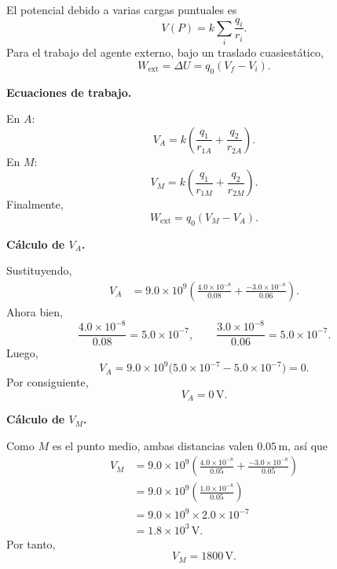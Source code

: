 \documentclass[11pt]{article}
\begin{document}
El potencial debido a varias cargas puntuales es
\begin{equation*}
    V(P)=k\sum_i \frac{q_i}{r_i}.
\end{equation*}
Para el trabajo del agente externo, bajo un traslado cuasiest\'atico,
\begin{equation*}
    W_{\text{ext}}=\Delta U=q_0(V_f-V_i).
\end{equation*}

\textbf{Ecuaciones de trabajo.}

En $A$:
\begin{equation*}
    V_A=k\left(\frac{q_1}{r_{1A}}+\frac{q_2}{r_{2A}}\right).
\end{equation*}
En $M$:
\begin{equation*}
    V_M=k\left(\frac{q_1}{r_{1M}}+\frac{q_2}{r_{2M}}\right).
\end{equation*}
Finalmente,
\begin{equation*}
    W_{\text{ext}}=q_0(V_M-V_A).
\end{equation*}

\textbf{C\'alculo de $V_A$.}

Sustituyendo,
\begin{align*}
    V_A
    &=9.0\times 10^9\left(\frac{4.0\times 10^{-8}}{0.08}+\frac{-3.0\times 10^{-8}}{0.06}\right).
\end{align*}
Ahora bien,
\begin{equation*}
    \frac{4.0\times 10^{-8}}{0.08}=5.0\times 10^{-7},
    \qquad
    \frac{3.0\times 10^{-8}}{0.06}=5.0\times 10^{-7}.
\end{equation*}
Luego,
\begin{equation*}
    V_A=9.0\times 10^9\big(5.0\times 10^{-7}-5.0\times 10^{-7}\big)=0.
\end{equation*}
Por consiguiente,
\begin{equation*}
    \boxed{V_A=0\,\text{V}}.
\end{equation*}

\textbf{C\'alculo de $V_M$.}

Como $M$ es el punto medio, ambas distancias valen $0.05\,\text{m}$, as\'i que
\begin{align*}
    V_M
    &=9.0\times 10^9\left(\frac{4.0\times 10^{-8}}{0.05}+\frac{-3.0\times 10^{-8}}{0.05}\right)\\
    &=9.0\times 10^9\left(\frac{1.0\times 10^{-8}}{0.05}\right)\\
    &=9.0\times 10^9\times 2.0\times 10^{-7}\\
    &=1.8\times 10^3\,\text{V}.
\end{align*}
Por tanto,
\begin{equation*}
    \boxed{V_M=1800\,\text{V}}.
\end{equation*}
\end{document}
